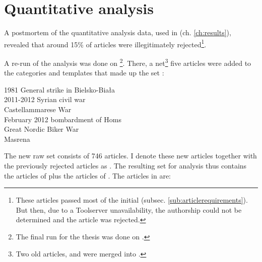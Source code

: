 \section{Quantitative analysis}

A postmortem of the quantitative analysis data, used in  (ch. \ref{ch:results}), revealed that around 15\% of articles were illegitimately rejected\footnote{These articles passed most of the initial  (subsec. \ref{sub:articlerequirements}). But then, due to a Toolserver unavailability, the authorship could not be determined and the article was rejected.}.

A re-run of the analysis was done on \footnote{The final run for the thesis was done on .}.
There, a net\footnote{Two old articles,  and  were merged into .} five articles were added to the categories and templates that made up the set :

\begin{multicols}{2}\scriptsize
\setlength{\parindent}{0pt}
1981 General strike in Bielsko-Biała\\
2011-2012 Syrian civil war\\
Castellammarese War\\
February 2012 bombardment of Homs\\
Great Nordic Biker War\\
Masrena
\end{multicols}

The new raw set  consists of 746 articles. 
I denote these new articles together with the previously rejected articles as .
The resulting set for analysis  thus contains the articles of  plus the articles of .
The  articles in  are:

